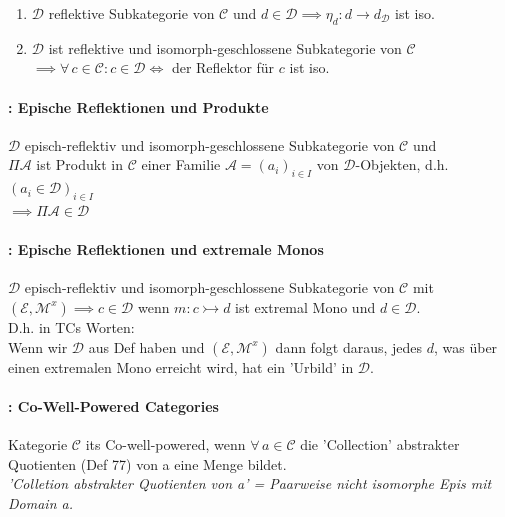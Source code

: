 \begin{enumerate}
\item  $\mathcal{D} $ reflektive Subkategorie von $\mathcal{C} $ und $d \in \mathcal{D} \implies \eta_d : d \rightarrow d_\mathcal{D}$ ist iso.
\item  $\mathcal{D} $ ist reflektive und isomorph-geschlossene Subkategorie von $\mathcal{C}$ \\ $ \implies \forall \, c \in \mathcal{C}: c \in \mathcal{D} \Leftrightarrow $ der Reflektor für $c$ ist iso.  
\end{enumerate}

\paragraph{: Epische Reflektionen und Produkte}

 $\mathcal{D}$ episch-reflektiv und isomorph-geschlossene Subkategorie von $\mathcal{C}$ und \\ $\Pi \mathcal{A}$ ist Produkt in $\mathcal{C}$ einer Familie $\mathcal{A} = (a_i)_{i \in I} $ von $\mathcal{D}$-Objekten, d.h. $(a_i \in \mathcal{D})_{i \in I}$ \\$ \implies \Pi \mathcal{A} \in \mathcal{D}$
 
 \paragraph{: Epische Reflektionen und extremale Monos}
 $\mathcal{D}$ episch-reflektiv und isomorph-geschlossene Subkategorie von $\mathcal{C}$ mit $(\mathcal{E}, \mathcal{M}^x) \implies c \in \mathcal{D}$ wenn $m: c \rightarrowtail d$ ist extremal Mono und $d \in \mathcal{D}$. \\
 D.h. in TCs Worten: \\
 Wenn wir $\mathcal{D}$ aus Def haben und  $(\mathcal{E}, \mathcal{M}^x)$ dann folgt daraus, jedes $d$, was über einen extremalen Mono erreicht wird, hat ein 'Urbild' in $\mathcal{D}$.
 
 
\paragraph{: Co-Well-Powered Categories}
Kategorie $\mathcal{C}$ its Co-well-powered, wenn $\forall \, a \in \mathcal{C}$ die 'Collection' abstrakter Quotienten (Def 77) von a eine Menge bildet. \\
\emph{'Colletion abstrakter Quotienten von a' = Paarweise nicht isomorphe Epis mit Domain a.}
 
